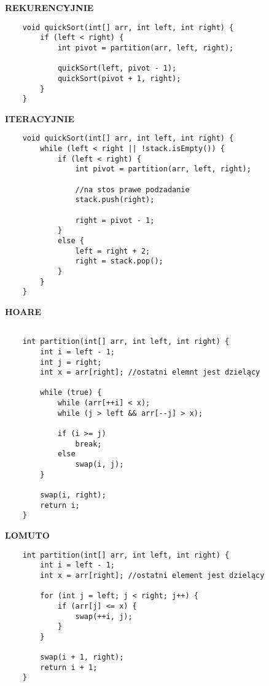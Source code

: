 \documentclass[advanced-sorts.tex]{subfiles}
\begin{document}
    \textbf{REKURENCYJNIE}
    \begin{verbatim}
    void quickSort(int[] arr, int left, int right) {
        if (left < right) {
            int pivot = partition(arr, left, right);

            quickSort(left, pivot - 1);
            quickSort(pivot + 1, right);
        }
    }
    \end{verbatim}

    \textbf{ITERACYJNIE}
    \begin{verbatim}
    void quickSort(int[] arr, int left, int right) {
        while (left < right || !stack.isEmpty()) {
            if (left < right) {
                int pivot = partition(arr, left, right);

                //na stos prawe podzadanie
                stack.push(right);

                right = pivot - 1;
            }
            else {
                left = right + 2;
                right = stack.pop();
            }
        }
    }
    \end{verbatim}

    \pagebreak

    \textbf{HOARE}
    \begin{verbatim}

    int partition(int[] arr, int left, int right) {
        int i = left - 1;
        int j = right;
        int x = arr[right]; //ostatni elemnt jest dzielący

        while (true) {
            while (arr[++i] < x);
            while (j > left && arr[--j] > x);

            if (i >= j)
                break;
            else
                swap(i, j);
        }

        swap(i, right);
        return i;
    }
    \end{verbatim}

    \textbf{LOMUTO}
    \begin{verbatim}
    int partition(int[] arr, int left, int right) {
        int i = left - 1;
        int x = arr[right]; //ostatni element jest dzielący

        for (int j = left; j < right; j++) {
            if (arr[j] <= x) {
                swap(++i, j);
            }
        }

        swap(i + 1, right);
        return i + 1;
    }
    \end{verbatim}
\end{document}

